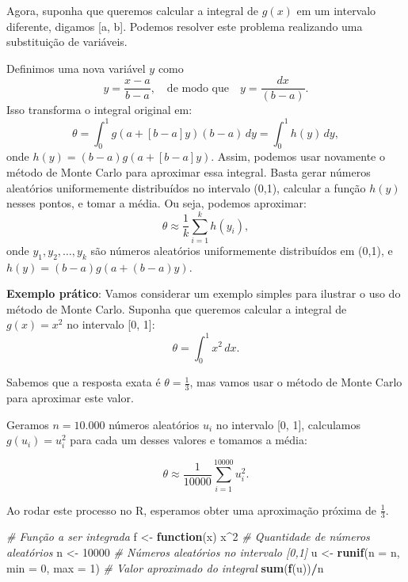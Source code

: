 \documentclass[
]{book}
\newenvironment{Shaded}{\begin{snugshade}}{\end{snugshade}}
\newcommand{\AttributeTok}[1]{\textcolor[rgb]{0.13,0.29,0.53}{#1}}
\newcommand{\CommentTok}[1]{\textcolor[rgb]{0.56,0.35,0.01}{\textit{#1}}}
\newcommand{\ControlFlowTok}[1]{\textcolor[rgb]{0.13,0.29,0.53}{\textbf{#1}}}
\newcommand{\DecValTok}[1]{\textcolor[rgb]{0.00,0.00,0.81}{#1}}
\newcommand{\FunctionTok}[1]{\textcolor[rgb]{0.13,0.29,0.53}{\textbf{#1}}}
\newcommand{\NormalTok}[1]{#1}
\newcommand{\OtherTok}[1]{\textcolor[rgb]{0.56,0.35,0.01}{#1}}
\newcommand{\SpecialCharTok}[1]{\textcolor[rgb]{0.81,0.36,0.00}{\textbf{#1}}}
\begin{document}
Agora, suponha que queremos calcular a integral de \(g(x)\) em um
intervalo diferente, digamos {[}a, b{]}. Podemos resolver este problema
realizando uma substituição de variáveis.

Definimos uma nova variável \(y\) como
\[y=\frac{x-a}{b-a}, \quad \text{de modo que} \quad y = \frac{dx}{(b-a)}.\]
Isso transforma o integral original em:
\[\theta = \int_{0}^{1}g(a+[b-a]y)(b-a)\,dy = \int_{0}^{1}h(y)\,dy,\]
onde \(h(y) = (b-a)g(a+[b-a]y)\). Assim, podemos usar novamente o método
de Monte Carlo para aproximar essa integral. Basta gerar números
aleatórios uniformemente distribuídos no intervalo (0,1), calcular a
função \(h(y)\) nesses pontos, e tomar a média. Ou seja, podemos
aproximar: \[
\theta \approx \frac{1}{k} \sum_{i=1}^{k} h(y_i),
\] onde \(y_1, y_2, \ldots, y_k\) são números aleatórios uniformemente
distribuídos em (0,1), e \(h(y) = (b - a)g(a + (b - a)y)\).

\textbf{Exemplo prático}: Vamos considerar um exemplo simples para ilustrar o
uso do método de Monte Carlo. Suponha que queremos calcular a integral
de \(g(x) = x^2\) no intervalo {[}0, 1{]}: \[\theta = \int_{0}^{1} x^2\, dx.\]

Sabemos que a resposta exata é \(\theta = \frac{1}{3}\), mas vamos usar o
método de Monte Carlo para aproximar este valor.

Geramos \(n = 10.000\) números aleatórios \(u_i\) no intervalo {[}0, 1{]},
calculamos \(g(u_i) = u_i^2\) para cada um desses valores e tomamos a
média:

\[\theta \approx \frac{1}{10000} \sum_{i=1}^{10000} u_i^2.\]

Ao rodar este processo no R, esperamos obter uma aproximação próxima de
\(\frac{1}{3}\).

\begin{Shaded}
\begin{Highlighting}[]
\CommentTok{\# Função a ser integrada}
\NormalTok{f }\OtherTok{\textless{}{-}} \ControlFlowTok{function}\NormalTok{(x) x}\SpecialCharTok{\^{}}\DecValTok{2}
\CommentTok{\# Quantidade de números aleatórios}
\NormalTok{n }\OtherTok{\textless{}{-}} \DecValTok{10000}
\CommentTok{\# Números aleatórios no intervalo [0,1]}
\NormalTok{u }\OtherTok{\textless{}{-}} \FunctionTok{runif}\NormalTok{(}\AttributeTok{n =}\NormalTok{ n, }\AttributeTok{min =} \DecValTok{0}\NormalTok{, }\AttributeTok{max =} \DecValTok{1}\NormalTok{)}
\CommentTok{\# Valor aproximado do integral}
\FunctionTok{sum}\NormalTok{(}\FunctionTok{f}\NormalTok{(u))}\SpecialCharTok{/}\NormalTok{n}
\end{Highlighting}
\end{Shaded}
\end{document}
